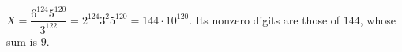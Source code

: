 $X=\dfrac{6^{124}5^{120}}{3^{122}}=2^{124}3^2 5^{120}=144\cdot10^{120}$. Its nonzero digits are those of $144$, whose sum is $\boxed9$.
